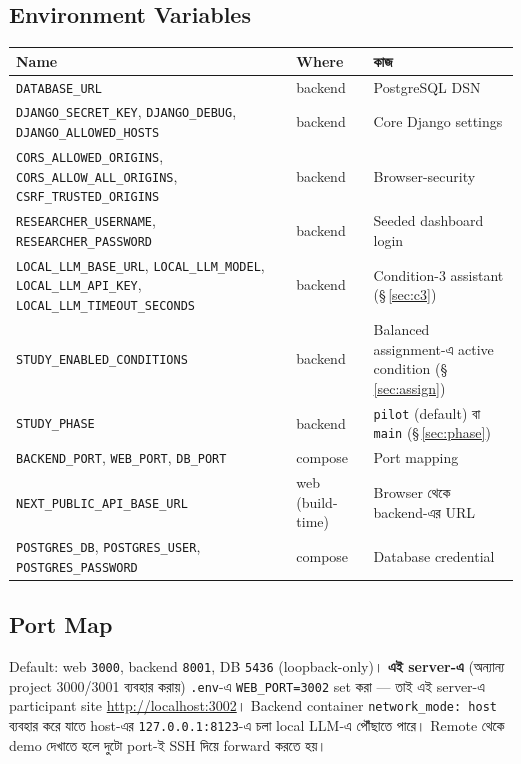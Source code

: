 \documentclass[11pt,a4paper]{article}
\newcommand{\code}[1]{\texttt{\small #1}}
\begin{document}
\subsection{Environment Variables}
\begin{longtable}{@{}p{5.2cm}p{2.0cm}p{9.0cm}@{}}
\toprule
\textbf{Name} & \textbf{Where} & \textbf{কাজ} \\
\midrule
\endhead
\code{DATABASE\_URL} & backend & PostgreSQL DSN \\
\code{DJANGO\_SECRET\_KEY}, \newline \code{DJANGO\_DEBUG}, \newline
  \code{DJANGO\_ALLOWED\_HOSTS} & backend & Core Django settings \\
\code{CORS\_ALLOWED\_ORIGINS}, \newline \code{CORS\_ALLOW\_ALL\_ORIGINS}, \newline
  \code{CSRF\_TRUSTED\_ORIGINS} & backend & Browser-security \\
\code{RESEARCHER\_USERNAME}, \newline \code{RESEARCHER\_PASSWORD} & backend & Seeded dashboard
  login \\
\code{LOCAL\_LLM\_BASE\_URL}, \newline \code{LOCAL\_LLM\_MODEL}, \newline
  \code{LOCAL\_LLM\_API\_KEY}, \newline \code{LOCAL\_LLM\_TIMEOUT\_SECONDS} & backend &
  Condition-3 assistant (\S\,\ref{sec:c3}) \\
\code{STUDY\_ENABLED\_CONDITIONS} & backend & Balanced assignment-এ active condition
  (\S\,\ref{sec:assign}) \\
\code{STUDY\_PHASE} & backend & \code{pilot} (default) বা \code{main} (\S\,\ref{sec:phase}) \\
\code{BACKEND\_PORT}, \newline \code{WEB\_PORT}, \code{DB\_PORT} & compose & Port mapping \\
\code{NEXT\_PUBLIC\_API\_BASE\_URL} & web (build-time) & Browser থেকে backend-এর URL \\
\code{POSTGRES\_DB}, \newline \code{POSTGRES\_USER}, \newline \code{POSTGRES\_PASSWORD} &
  compose & Database credential \\
\bottomrule
\end{longtable}

\subsection{Port Map}
Default: web \code{3000}, backend \code{8001}, DB \code{5436} (loopback-only)। \textbf{এই
server-এ} (অন্যান্য project 3000/3001 ব্যবহার করায়) \code{.env}-এ \code{WEB\_PORT=3002} set
করা --- তাই এই server-এ participant site \url{http://localhost:3002}। Backend container
\code{network\_mode: host} ব্যবহার করে যাতে host-এর \code{127.0.0.1:8123}-এ চলা local LLM-এ
পৌঁছাতে পারে। Remote থেকে demo দেখাতে হলে দুটো port-ই SSH দিয়ে forward করতে হয়।
\end{document}
